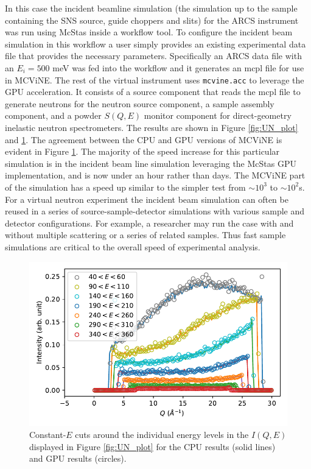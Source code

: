 In this case the incident beamline simulation (the simulation up to the sample containing the SNS source, guide choppers and slits) for the ARCS instrument\cite{stone2014comparison} was run using McStas\cite{Willendrup:2020aa,Willendrup:2021aa} inside a workflow tool\cite{10.1007/978-3-031-23606-8_9}.
To configure the incident beam simulation in this workflow a user simply provides an existing experimental data file that provides the necessary parameters.
Specifically an ARCS data file with an $E_i = 500$ meV was fed into the workflow and it generates an mcpl\cite{KITTELMANN201717} file\cite{data_doi} for use in  MCViNE.
The rest of the virtual instrument uses \texttt{mcvine.acc} to leverage the GPU acceleration. It consists of a source component that reads the mcpl file to generate neutrons for the neutron source component,  a sample assembly component, and a powder $S(Q, E)$ monitor component for direct-geometry inelastic neutron spectrometers.
The results are shown in Figure \ref{fig:UN_plot} and \ref{fig:UN_cuts}.
The agreement between the CPU and GPU versions of MCViNE is evident in Figure \ref{fig:UN_cuts}. 
The majority of the speed increase for this particular simulation is in the incident beam line simulation leveraging the McStas GPU implementation, and is now under an hour rather than days.
The MCViNE part of the simulation has a speed up similar to the simpler test from $\sim 10^3$ to $\sim 10^2$s.
For a virtual neutron experiment the incident beam simulation can often be reused in a series of source-sample-detector simulations with various sample and detector configurations.
For example, a researcher may run the case with and without multiple scattering or a series of related samples. Thus fast sample simulations are critical to the overall speed of experimental analysis.



\begin{figure}[H]
\centering
\includegraphics[width=\columnwidth]{figures/Constant_E_cuts.pdf}
\caption{Constant-$E$ cuts around the individual energy levels 
in the $I(Q, E)$ displayed in
Figure \ref{fig:UN_plot} for the CPU results (solid lines)
and GPU results (circles).
}
\label{fig:UN_cuts}
\end{figure}

